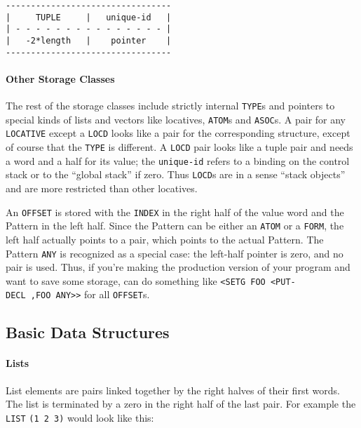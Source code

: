 \documentclass[a4paper,]{article}
\let\oldparagraph\paragraph
\renewcommand{\paragraph}[1]{\oldparagraph{#1}\mbox{}}
\begin{document}
\begin{verbatim}
---------------------------------
|     TUPLE     |   unique-id   |
| - - - - - - - - - - - - - - - |
|   -2*length   |    pointer    |
---------------------------------
\end{verbatim}

\paragraph{Other Storage Classes}\label{other-storage-classes}

The rest of the storage classes include strictly internal \texttt{TYPE}s and pointers to special kinds of lists and vectors
like locatives, \texttt{ATOM}s and \texttt{ASOC}s. A pair for any
\texttt{LOCATIVE} except a \texttt{LOCD} looks like a pair for the corresponding structure, except
of course that the \texttt{TYPE} is different. A \texttt{LOCD} pair looks like a tuple pair and needs a word and a half for
its value; the \texttt{unique-id} refers to a binding on the control stack or to the ``global stack'' if zero. Thus
\texttt{LOCD}s are in a sense ``stack objects'' and are more restricted than other locatives.

An \texttt{OFFSET} is stored with the \texttt{INDEX} in the right half of the value word and the
Pattern in the left half. Since the Pattern can be either an \texttt{ATOM} or a \texttt{FORM}, the
left half actually points to a pair, which points to the actual Pattern. The Pattern \texttt{ANY} is recognized as a
special case: the left-half pointer is zero, and no pair is used. Thus, if you're making the production version of your
program and want to save some storage, can do something like
\texttt{\textless{}SETG\ FOO\ \textless{}PUT-DECL\ ,FOO\ ANY\textgreater{}\textgreater{}} for all \texttt{OFFSET}s.

\subsection{Basic Data Structures}\label{basic-data-structures}

\paragraph{Lists}\label{lists}

List elements are pairs linked together by the right halves of their first words. The list is terminated by a zero in the
right half of the last pair. For example the  \texttt{LIST} \texttt{(1\ 2\ 3)} would look like this:
\end{document}
